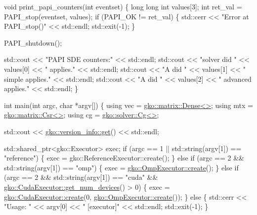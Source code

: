 \begin{DoxyCodeInclude}
\textcolor{keywordtype}{void} print\_papi\_counters(\textcolor{keywordtype}{int} eventset)
\{
    \textcolor{keywordtype}{long} \textcolor{keywordtype}{long} \textcolor{keywordtype}{int} values[3];
    \textcolor{keywordtype}{int} ret\_val = PAPI\_stop(eventset, values);
    \textcolor{keywordflow}{if} (PAPI\_OK != ret\_val) \{
        std::cerr << \textcolor{stringliteral}{"Error at PAPI\_stop()"} << std::endl;
        std::exit(-1);
    \}

    PAPI\_shutdown();

    std::cout << \textcolor{stringliteral}{"PAPI SDE counters:"} << std::endl;
    std::cout << \textcolor{stringliteral}{"solver did "} << values[0] << \textcolor{stringliteral}{" applies."} << std::endl;
    std::cout << \textcolor{stringliteral}{"A did "} << values[1] << \textcolor{stringliteral}{" simple applies."} << std::endl;
    std::cout << \textcolor{stringliteral}{"A did "} << values[2] << \textcolor{stringliteral}{" advanced applies."} << std::endl;
\}


\textcolor{keywordtype}{int} main(\textcolor{keywordtype}{int} argc, \textcolor{keywordtype}{char} *argv[])
\{
    \textcolor{keyword}{using} vec = \hyperlink{classgko_1_1matrix_1_1Dense}{gko::matrix::Dense<>};
    \textcolor{keyword}{using} mtx = \hyperlink{classgko_1_1matrix_1_1Csr}{gko::matrix::Csr<>};
    \textcolor{keyword}{using} cg = \hyperlink{classgko_1_1solver_1_1Cg}{gko::solver::Cg<>};

    std::cout << \hyperlink{classgko_1_1version__info_a6daeb8a087cfb57fa055526fc133d8eb}{gko::version\_info::get}() << std::endl;

    std::shared\_ptr<gko::Executor> exec;
    \textcolor{keywordflow}{if} (argc == 1 || std::string(argv[1]) == \textcolor{stringliteral}{"reference"}) \{
        exec = gko::ReferenceExecutor::create();
    \} \textcolor{keywordflow}{else} \textcolor{keywordflow}{if} (argc == 2 && std::string(argv[1]) == \textcolor{stringliteral}{"omp"}) \{
        exec = \hyperlink{classgko_1_1OmpExecutor_a33ca05fdd0fc928ee262fc9425304874}{gko::OmpExecutor::create}();
    \} \textcolor{keywordflow}{else} \textcolor{keywordflow}{if} (argc == 2 && std::string(argv[1]) == \textcolor{stringliteral}{"cuda"} &&
               \hyperlink{classgko_1_1CudaExecutor_aef0258494d14de0e56149b920c5173e5}{gko::CudaExecutor::get\_num\_devices}() > 0) \{
        exec = \hyperlink{classgko_1_1CudaExecutor_a2718a92034350650ef406ffdb60db090}{gko::CudaExecutor::create}(0, 
      \hyperlink{classgko_1_1OmpExecutor_a33ca05fdd0fc928ee262fc9425304874}{gko::OmpExecutor::create}());
    \} \textcolor{keywordflow}{else} \{
        std::cerr << \textcolor{stringliteral}{"Usage: "} << argv[0] << \textcolor{stringliteral}{" [executor]"} << std::endl;
        std::exit(-1);
    \}


\end{DoxyCodeInclude}
